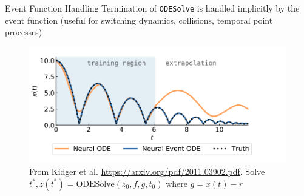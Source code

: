 \documentclass[usenames,dvipsnames]{beamer}
\theoremstyle{definition}
\begin{document}
\begin{frame}{Event Function Handling}
    Termination of \texttt{ODESolve} is handled implicitly by the event function (useful for switching dynamics, collisions, temporal point processes)

    \begin{figure}
        \centering
        \includegraphics[width=0.5\linewidth]{bouncing_ball.png}
        \caption{From Kidger et al. \url{https://arxiv.org/pdf/2011.03902.pdf}. Solve $t^{\ast}, z(t^{\ast}) = \textrm{ODESolve}(z_0, f, g, t_0)$ where $g = x(t) - r$}
        \label{fig:bball_neural_event_function}
    \end{figure}
\end{frame}

    
\end{document}
